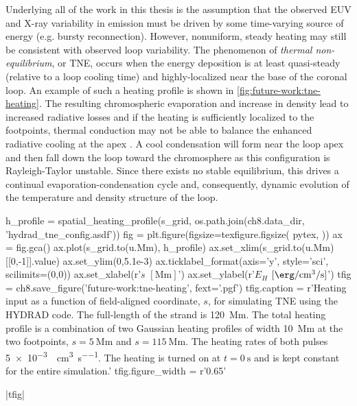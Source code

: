 Underlying all of the work in this thesis is the assumption that the observed EUV and X-ray variability in \AR{} emission must be driven by some time-varying source of energy (e.g. bursty reconnection). However, nonuniform, steady heating may still be consistent with observed loop variability. The phenomenon of \textit{thermal non-equilibrium}, or TNE, occurs when the energy deposition is at least quasi-steady (relative to a loop cooling time) and highly-localized near the base of the coronal loop. An example of such a heating profile is shown in \autoref{fig:future-work:tne-heating}. The resulting chromospheric evaporation and increase in density lead to increased radiative losses and if the heating is sufficiently localized to the footpoints, thermal conduction may not be able to balance the enhanced radiative cooling at the apex \citep{kuin_thermal_1982,antiochos_model_1991}. A cool condensation will form near the loop apex and then fall down the loop toward the chromosphere as this configuration is Rayleigh-Taylor unstable. Since there exists no stable equilibrium, this drives a continual evaporation-condensation cycle and, consequently, dynamic evolution of the temperature and density structure of the loop.

\begin{pycode}[chapter8]
h_profile = spatial_heating_profile(s_grid, os.path.join(ch8.data_dir, 'hydrad_tne_config.asdf'))
fig = plt.figure(figsize=texfigure.figsize(
    pytex,
))
ax = fig.gca()
ax.plot(s_grid.to(u.Mm), h_profile)
ax.set_xlim(s_grid.to(u.Mm)[[0,-1]].value)
ax.set_ylim(0,5.1e-3)
ax.ticklabel_format(axis='y', style='sci', scilimits=(0,0))
ax.set_xlabel(r'$s$ $[\si{\mega\m}]$')
ax.set_ylabel(r'$E_H$ $[\si{\erg\per\cubic\cm\per\second}]$')
tfig = ch8.save_figure('future-work:tne-heating', fext='.pgf')
tfig.caption = r'Heating input as a function of field-aligned coordinate, $s$, for simulating TNE using the HYDRAD code. The full-length of the strand is \SI{120}{\mega\m}. The total heating profile is a combination of two Gaussian heating profiles of width \SI{10}{\mega\m} at the two footpoints, $s=\SI{5}{\mega\m}$ and $s=\SI{115}{\mega\m}$. The heating rates of both pulses \SI{5e-3}{\erg\per\cubic\cm\per\second}. The heating is turned on at $t=\SI{0}{\second}$ and is kept constant for the entire simulation.'
tfig.figure_width = r'0.65\textwidth'
\end{pycode}
\py[chapter8]|tfig|


